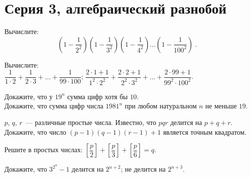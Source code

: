 

\section*{Серия 3, алгебраический разнобой}


\begin{problems}

\item 
Вычислите:
\[
    \left(
        1 - \frac{1}{2^2}
    \right)
    \left(
        1 - \frac{1}{3^2}
    \right)
    \left(
        1 - \frac{1}{4^2}
    \right)
    \ldots
    \left(
        1 - \frac{1}{100^2}
    \right)
\;.\]

\item
Вычислите:
\\[0.7ex]
\sbp
\(
    \dfrac{1}{1 \cdot 2} + \dfrac{1}{2 \cdot 3}
    + \ldots +
    \dfrac{1}{99 \cdot 100}
\);
\qquad
\sbp
\(
    \dfrac{2 \cdot 1 + 1}{1^2 \cdot 2^2}
    +
    \dfrac{2 \cdot 2 + 1}{2^2 \cdot 3^2}
    + \ldots +
    \dfrac{2 \cdot 99 + 1}{99^2 \cdot 100^2}
\).

\item
\sbp
Докажите, что у $19^n$ сумма цифр хотя бы $10$.
\\
\sbp
Докажите, что сумма цифр числа $1981^n$ при любом натуральном $n$ не меньше $19$.

\item
$p$, $q$, $r$~--- различные простые числа.
Известно, что $pqr$ делится на $p + q + r$.
Докажите, что число $(p - 1) (q - 1) (r - 1) + 1$ является точным квадратом.

\item
Решите в простых числах:
\(
    \left[\dfrac{p}{2}\right]
    +
    \left[\dfrac{p}{3}\right]
    +
    \left[\dfrac{p}{6}\right]
=
    q
\).

\item
Докажите, что $3^{2^n} - 1$
\quad
\sbp делится на $2^{n+2}$;
\quad
\sbp не делится на $2^{n+3}$.

\end{problems}


